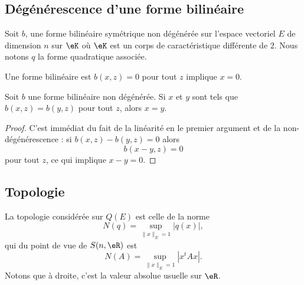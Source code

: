 \subsection{Dégénérescence d'une forme bilinéaire}

Soit \( b\), une forme bilinéaire symétrique non dégénérée  sur l'espace vectoriel \( E\) de dimension \( n\) sur \( \eK\) où \( \eK\) est un corps de caractéristique différente de \( 2\). Nous notons \( q\) la forme quadratique associée.

\begin{definition}      \label{DEFooNUBFooLfCqaK}
    Une forme bilinéaire est  \( b(x,z)=0\) pour tout \( z\) implique \( x=0\).
\end{definition}

\begin{lemma}   \label{LemyKJpVP}
    Soit \( b\) une forme bilinéaire non dégénérée. Si \( x\) et \( y\) sont tels que \( b(x,z)=b(y,z)\) pour tout \( z\), alors \( x=y\).
\end{lemma}

\begin{proof}
    C'est immédiat du fait de la linéarité en le premier argument et de la non-dégénérescence : si \( b(x,z)-b(y,z)=0\) alors
    \begin{equation}
        b(x-y,z)=0
    \end{equation}
    pour tout \( z\), ce qui implique \( x-y=0\).
\end{proof}


\subsection{Topologie}

La topologie considérée sur \( Q(E)\) est celle de la norme
\begin{equation}    \label{EqZYBooZysmVh}
    N(q)=\sup_{\| x \|_E=1}| q(x) |,
\end{equation}
qui du point de vue de \( S(n,\eR)\) est
\begin{equation}    \label{EQooJETQooIjxRWu}
    N(A)=\sup_{\| x \|_E=1}| x^tAx |.
\end{equation}
Notons que à droite, c'est la valeur absolue usuelle sur \( \eR\).


